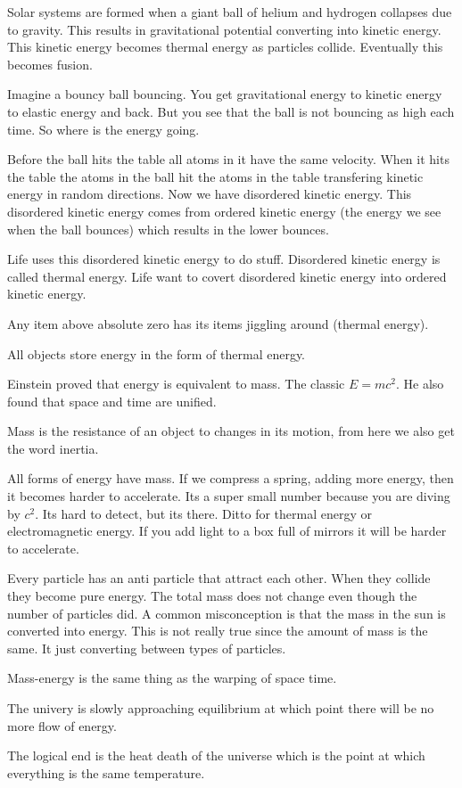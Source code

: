 \documentclass{article}
\begin{document}

Solar systems are formed when a giant ball of helium and hydrogen collapses due to gravity. This results in gravitational potential converting into kinetic energy. This kinetic energy becomes thermal energy as particles collide. Eventually this becomes fusion.


Imagine a bouncy ball bouncing. You get gravitational energy to kinetic energy to elastic energy and back. But you see that the ball is not bouncing as high each time. So where is the energy going.


Before the ball hits the table all atoms in it have the same velocity. When it hits the table the atoms in the ball hit the atoms in the table transfering kinetic energy in random directions. Now we have disordered kinetic energy. This disordered kinetic energy comes from ordered kinetic energy (the energy we see when the ball bounces) which results in the lower bounces.

Life uses this disordered kinetic energy to do stuff. Disordered kinetic energy is called thermal energy. Life want to covert disordered kinetic energy into ordered kinetic energy.


Any item above absolute zero has its items jiggling around (thermal energy).


All objects store energy in the form of thermal energy.




Einstein proved that energy is equivalent to mass. The classic $E=mc^2$. He also found that space and time are unified.


Mass is the resistance of an object to changes in its motion, from here we also get the word inertia.


All forms of energy have mass.
If we compress a spring, adding more energy, then it becomes harder to accelerate. Its a super small number because you are diving by $c^2$. Its hard to detect, but its there. Ditto for thermal energy or electromagnetic energy. If you add light to a box full of mirrors it will be harder to accelerate.


Every particle has an anti particle that attract each other. When they collide they become pure energy. The total mass does not change even though the number of particles did. A common misconception is that the mass in the sun is converted into energy. This is not really true since the amount of mass is the same. It just converting between types of particles.


Mass-energy is the same thing as the warping of space time.


The univery is slowly approaching equilibrium at which point there will be no more flow of energy.


The logical end is the heat death of the universe which is the point at which everything is the same temperature.


\end{document}
